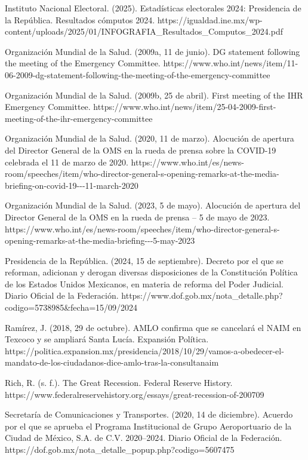 \begin{referencias}
Instituto Nacional Electoral. (2025). Estadísticas electorales 2024: Presidencia de la República. Resultados cómputos 2024. https://igualdad.ine.mx/wp-content/uploads/2025/01/INFOGRAFIA\_Resultados\_Computos\_2024.pdf

Organización Mundial de la Salud. (2009a, 11 de junio). DG statement following the meeting of the Emergency Committee. https://www.who.int/news/item/11-06-2009-dg-statement-following-the-meeting-of-the-emergency-committee

Organización Mundial de la Salud. (2009b, 25 de abril). First meeting of the IHR Emergency Committee. https://www.who.int/news/item/25-04-2009-first-meeting-of-the-ihr-emergency-committee

Organización Mundial de la Salud. (2020, 11 de marzo). Alocución de apertura del Director General de la OMS en la rueda de prensa sobre la COVID-19 celebrada el 11 de marzo de 2020. https://www.who.int/es/news-room/speeches/item/who-director-general-s-opening-remarks-at-the-media-briefing-on-covid-19-\/-\/-11-march-2020

Organización Mundial de la Salud. (2023, 5 de mayo). Alocución de apertura del Director General de la OMS en la rueda de prensa -- 5 de mayo de 2023. https://www.who.int/es/news-room/speeches/item/who-director-general-s-opening-remarks-at-the-media-briefing-\/-\/-5-may-2023

Presidencia de la República. (2024, 15 de septiembre). Decreto por el que se reforman, adicionan y derogan diversas disposiciones de la Constitución Política de los Estados Unidos Mexicanos, en materia de reforma del Poder Judicial. Diario Oficial de la Federación. https://www.dof.gob.mx/nota\_detalle.php?codigo=5738985\&fecha=15/09/2024

Ramírez, J. (2018, 29 de octubre). AMLO confirma que se cancelará el NAIM en Texcoco y se ampliará Santa Lucía. Expansión Política. https://politica.expansion.mx/presidencia/2018/10/29/vamos-a-obedecer-el-mandato-de-los-ciudadanos-dice-amlo-tras-la-consultanaim

Rich, R. (s. f.). The Great Recession. Federal Reserve History. https://www.federalreservehistory.org/essays/great-recession-of-200709

Secretaría de Comunicaciones y Transportes. (2020, 14 de diciembre). Acuerdo por el que se aprueba el Programa Institucional de Grupo Aeroportuario de la Ciudad de México, S.A. de C.V. 2020--2024. Diario Oficial de la Federación. https://dof.gob.mx/nota\_detalle\_popup.php?codigo=5607475


\end{referencias}
